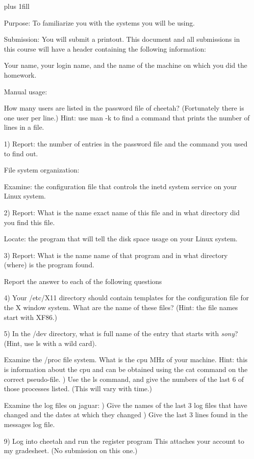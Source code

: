 
\rightskip=0pt plus 1fill

\parindent 0pt

Purpose:
To familiarize you with the systems you will be using.

Submission: You will submit a printout.
This document and all submissions in this course will have a header
containing the following information:

Your name, your login name, and the name of the machine on which you
did the homework.

Manual usage:

How many users are listed in the password file of cheetah?
(Fortunately there is one user per line.)
Hint: use {\ltt{}man -k} to find a command that prints the number
of lines in a file.

1) Report: the number of entries in the password file and
the command you used to find out.

File system organization:

Examine: the configuration file that controls the {\ltt{}inetd} system service
on your Linux system.

2) Report: What is the name exact name of this file
and in what directory did you find this file.

Locate: the program that will tell the disk space usage
on your Linux system.

3) Report: What is the name name of that program 
and in what directory (where) is the program found.

Report the answer to each of the following questions

4) Your {\ltt{}/etc/X11} directory should contain templates for
the configuration file for the {\ltt{}X} window system.
What are the name of these files?
(Hint: the file names start with XF86.)

5) In the {\ltt{}/dev} directory, what is full name of the entry that starts
with {\it sony}? (Hint, use ls with a wild card).

Examine the {\ltt{}/proc} file system.
What is the cpu MHz of your machine.
Hint: this is information about the cpu and can be obtained using the
cat command on the correct pseudo-file.
\hfill{}) Use the {\ltt{}ls} command, and give the numbers of the last 6
of those processes listed. (This will vary with time.)

Examine the log files on {\ltt{}jaguar}:
\hfill{}) Give the names of the last 3 log files that have changed and 
the dates at which they changed
\hfill{}) Give the last 3 lines found in the {\ltt{}messages} log file.

9) Log into {\ltt{}cheetah} and run the {\ltt{}register} program
This attaches your account to my gradesheet.
(No submission on this one.)

\bye

